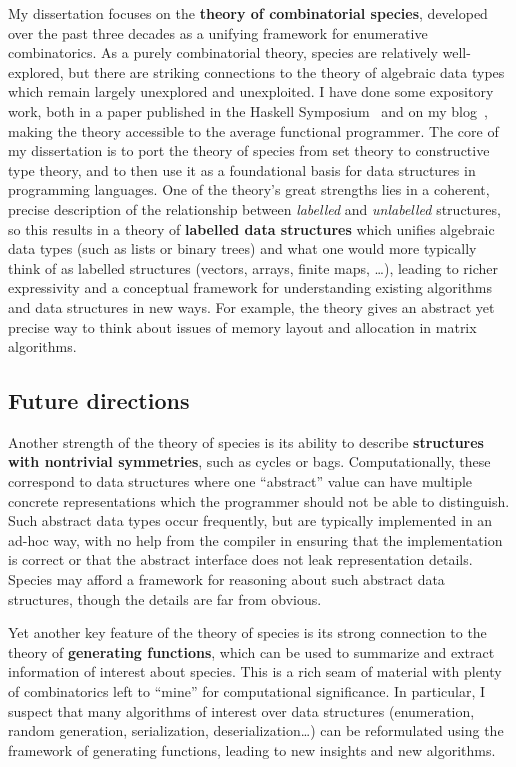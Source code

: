 \documentclass[12pt]{article}
\begin{document}
My dissertation focuses on the \textbf{theory of
  combinatorial species}, developed over the past three decades as a
unifying framework for enumerative combinatorics. As a purely
combinatorial theory, species are relatively well-explored, but there
are striking connections to the theory of algebraic data types which
remain largely unexplored and unexploited. I have done some
expository work, both in a paper published in the Haskell
Symposium~\cite{yorgey2010species} and on my blog~\cite{blog}, making the
theory accessible to the average functional programmer.  The core of
my dissertation is to port the theory of species from set theory to
constructive type theory, and to then use it as a foundational basis
for data structures in programming languages. One of the theory's
great strengths lies in a coherent, precise description of the
relationship between \emph{labelled} and \emph{unlabelled} structures,
so this results in a theory of \textbf{labelled data structures} which
unifies algebraic data types (such as lists or binary trees) and what
one would more typically think of as labelled structures (vectors,
arrays, finite maps, \dots), leading to richer expressivity and a
conceptual framework for understanding existing algorithms and data
structures in new ways.  For example, the theory gives an abstract yet
precise way to think about issues of memory layout and allocation in
matrix algorithms.

\subsection*{Future directions}

Another strength of the theory of species is its ability to describe
\textbf{structures with nontrivial symmetries}, such as cycles or
bags.  Computationally, these correspond to data structures where one
``abstract'' value can have multiple concrete representations which
the programmer should not be able to distinguish.  Such abstract data
types occur frequently, but are typically implemented in an ad-hoc
way, with no help from the compiler in ensuring that the
implementation is correct or that the abstract interface does not leak
representation details.  Species may afford a framework for reasoning
about such abstract data structures, though the details are far from
obvious.

Yet another key feature of the theory of species is its strong
connection to the theory of \textbf{generating functions}, which can
be used to summarize and extract information of interest about
species.  This is a rich seam of material with plenty of combinatorics
left to ``mine'' for computational significance.  In particular, I
suspect that many algorithms of interest over data structures
(enumeration, random generation, serialization, deserialization\dots)
can be reformulated using the framework of generating functions,
leading to new insights and new algorithms.



\end{document}
